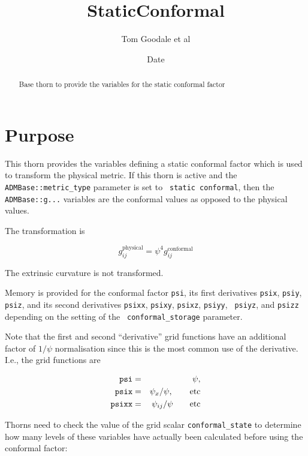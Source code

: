 \documentclass{article}
\begin{document}
\title{StaticConformal}
\author{Tom Goodale et al}
\date{$ $Date$ $}

\maketitle


\begin{abstract}
Base thorn to provide the variables for the static conformal factor
\end{abstract}

\section{Purpose}

This thorn provides the variables defining a static conformal factor
which is used to transform the physical metric.  If this thorn is
active and the {\tt ADMBase::metric\_type} parameter is set to {\tt
static conformal}, then the {\tt ADMBase::g...} variables are the
conformal values as opposed to the physical values.

The transformation is

$$ g_{ij}^{\mbox{physical}} = \psi^4 g_{ij}^{\mbox{conformal}} $$

The extrinsic curvature is not transformed.

Memory is provided for the conformal factor {\tt psi}, its first
derivatives {\tt psix}, {\tt psiy}, {\tt psiz}, and its second
derivatives {\tt psixx}, {\tt psixy}, {\tt psixz}, {\tt psiyy}, {\tt
psiyz}, and {\tt psizz} depending on the setting of the {\tt
conformal\_storage} parameter.

Note that the first and second ``derivative'' grid functions have an
additional factor of $1 / \psi$ normalisation since this is the most
common use of the derivative.  I.e., the grid functions are

\begin{eqnarray*}
 {\tt psi} &=& \psi, \\
 {\tt psix} &=& \psi_x/\psi, \qquad \mbox{etc}\\
 {\tt psixx} &=& \psi_{ij}/\psi \qquad \mbox{etc}
\end{eqnarray*}

Thorns need to check the value of the grid scalar 
{\tt conformal\_state} to determine how many levels of these variables have
actually been calculated before using the conformal factor:
\end{document}
